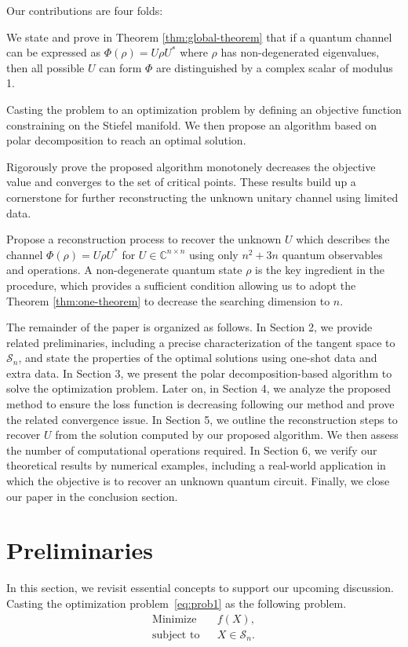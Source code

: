 \documentclass[sn-mathphys-num]{sn-jnl}%
\theoremstyle{thmstyleone}%
\theoremstyle{thmstyletwo}%
\theoremstyle{thmstylethree}%
\begin{document}
Our contributions are four folds:
\begin{itemize}
    \item We state and prove in Theorem \ref{thm:global-theorem} that if a quantum channel can be expressed as 
    $\Phi(\rho) = U\rho U^*$
    where $\rho$ has non-degenerated eigenvalues, then all possible $U$ can form $\Phi$ are distinguished by a complex scalar of modulus 1.  
    \item Casting the problem to an optimization problem by defining an objective function constraining on the Stiefel manifold. We then propose an algorithm based on polar decomposition to reach an optimal solution.
    \item Rigorously prove the proposed algorithm monotonely decreases the objective value and converges to the set of critical points. These results build up a cornerstone for further reconstructing the unknown unitary channel using limited data. 
    {
    \item Propose a reconstruction process to recover the unknown $U$ which describes the channel $\Phi(\rho) = U\rho U^*$ for $U\in \mathbb{C}^{n\times n}$ using only $n^2+3n$ quantum observables and operations. A non-degenerate quantum state $\rho$ is the key ingredient in the procedure, which provides a sufficient condition allowing us to adopt the Theorem \ref{thm:one-theorem} to decrease the searching dimension to $n$.
    }
\end{itemize}



The remainder of the paper is organized as follows. In Section 2, we provide related preliminaries, including a precise characterization of the tangent space to $\mathcal{S}_n$, and state the properties of the optimal solutions using one-shot data and extra data. In Section 3, we present the polar decomposition-based algorithm to solve the optimization problem. Later on, in Section 4, we analyze the proposed method to ensure the loss function is decreasing following our method and prove the related convergence issue. In Section 5, we outline the reconstruction steps to recover $U$ from the solution computed by our proposed algorithm. We then assess the number of computational operations required. In Section 6, we verify our theoretical results by numerical examples, including a real-world application in which the objective is to recover an unknown quantum circuit. Finally, we close our paper in the conclusion section.

\section{Preliminaries}
In this section, we revisit essential concepts to support our upcoming discussion. Casting the optimization problem~\ref{eq:prob1} as the following problem.
\begin{subequations}
\begin{eqnarray} 
\text{Minimize} && f(X),\\
\text{subject to} && X\in \mathcal{S}_{n}. 
\end{eqnarray}
\label{eq:fundamental}
\end{subequations}
\end{document}
